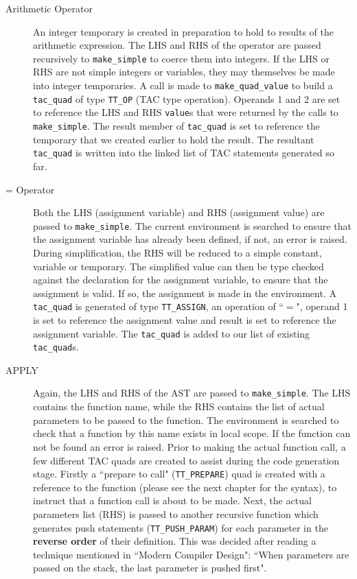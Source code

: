 \begin{description}
	\item[Arithmetic Operator] An integer temporary is created in preparation to hold to results of the arithmetic expression. The LHS and RHS of the operator are passed recursively to \verb!make_simple! to coerce them into integers. If the LHS or RHS are not simple integers or variables, they may themselves be made into integer temporaries. A call is made to \verb!make_quad_value! to build a \verb!tac_quad! of type \verb!TT_OP! (TAC type operation). Operands 1 and 2 are set to reference the LHS and RHS \verb!value!s that were returned by the calls to \verb!make_simple!. The result member of \verb!tac_quad! is set to reference the temporary that we created earlier to hold the result. The resultant \verb!tac_quad! is written into the linked list of TAC statements generated so far.
	\item[= Operator] Both the LHS (assignment variable) and RHS (assignment value) are passed to \verb!make_simple!. The current environment is searched to ensure that the assignment variable has already been defined, if not, an error is raised. During simplification, the RHS will be reduced to a simple constant, variable or temporary. The simplified value can then be type checked against the declaration for the assignment variable, to ensure that the assignment is valid. If so, the assignment is made in the environment. A \verb!tac_quad! is generated of type \verb!TT_ASSIGN!, an operation of ``$=$", operand 1 is set to reference the assignment value and result is set to reference the assignment variable. The \verb!tac_quad! is added to our list of existing \verb!tac_quad!s.
	\item[APPLY] Again, the LHS and RHS of the AST are passed to \verb!make_simple!. The LHS contains the function name, while the RHS contains the list of actual parameters to be passed to the function. The environment is searched to check that a function by this name exists in local scope. If the function can not be found an error is raised. Prior to making the actual function call, a few different TAC quads are created to assist during the code generation stage. Firstly a ``prepare to call" (\verb!TT_PREPARE!) quad is created with a reference to the function (please see the next chapter for the syntax), to instruct that a function call is about to be made. Next, the actual parameters list (RHS) is passed to another recursive function which generates push statements (\verb!TT_PUSH_PARAM!) for each parameter in the \textbf{reverse order} of their definition. This was decided after reading a technique mentioned in ``Modern Compiler Design"\cite{grune2000}: ``When parameters are passed on the stack, the last parameter is pushed first".

\end{description}
